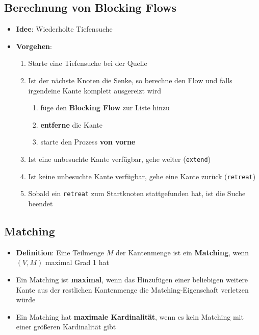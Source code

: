 \documentclass[10pt,a4paper]{article}
\begin{document}
	\subsection{Berechnung von Blocking Flows}
	\label{mfm:sub:berechnung_von_blocking_flows}
	
	\begin{itemize}
		\item \textbf{Idee}: Wiederholte Tiefensuche
		\item \textbf{Vorgehen}:
		\begin{enumerate}
			\item Starte eine Tiefensuche bei der Quelle
			\item Ist der nächste Knoten die Senke, so berechne den Flow und falls irgendeine Kante komplett ausgereizt wird
			\begin{enumerate}
				\item füge den \textbf{Blocking Flow} zur Liste hinzu
				\item \textbf{entferne} die Kante
				\item starte den Prozess \textbf{von vorne}
			\end{enumerate}
			\item Ist eine unbesuchte Kante verfügbar, gehe weiter (\texttt{extend})
			\item Ist keine unbesuchte Kante verfügbar, gehe eine Kante zurück (\texttt{retreat})
			\item Sobald ein \texttt{retreat} zum Startknoten stattgefunden hat, ist die Suche beendet
		\end{enumerate}
	\end{itemize}

	\subsection{Matching}
	\label{mfm:sub:matching}

	\begin{itemize}
		\item \textbf{Definition}: Eine Teilmenge $M$ der Kantenmenge ist ein \textbf{Matching}, wenn $(V, M)$ maximal Grad 1 hat
		\item Ein Matching ist \textbf{maximal}, wenn das Hinzufügen einer beliebigen weitere Kante aus der restlichen Kantenmenge die Matching-Eigenschaft verletzen würde
		\item Ein Matching hat \textbf{maximale Kardinalität}, wenn es kein Matching mit einer größeren Kardinalität gibt
	\end{itemize}
\end{document}
